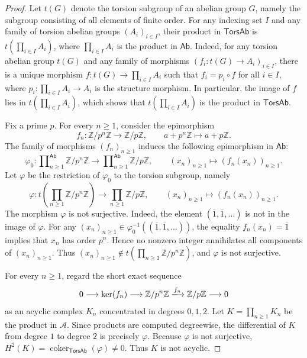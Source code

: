 \documentclass[10pt,a4paper]{amsart}
\theoremstyle{plain}
\theoremstyle{definition}
\theoremstyle{remark}
\begin{document}
\begin{proof}
  Let $t(G)$ denote the torsion subgroup of an abelian group $G$, namely the subgroup consisting of all elements of finite order.
  For any indexing set $I$ and any family of torsion abelian groups $(A_i)_{i\in I}$, their product in $\mathsf{TorsAb}$ is $t\left(\prod_{i\in I}A_i\right)$, where $\prod_{i\in I}A_i$ is the product in $\mathsf{Ab}$.
  Indeed, for any torsion abelian group $t(G)$ and any family of morphisms $(f_i:t(G)\longrightarrow A_i)_{i\in I}$, there is a unique morphism $f:t(G)\longrightarrow\prod_{i\in I}A_i$ such that $f_i=p_i\circ f$ for all $i\in I$, where $p_i:\prod_{i\in I}A_i\longrightarrow A_i$ is the structure morphism.
  In particular, the image of $f$ lies in $t\left(\prod_{i\in I}A_i\right)$, which shows that $t\left(\prod_{i\in I}A_i\right)$ is the product in $\mathsf{TorsAb}$.

  \medskip

  Fix a prime $p$.
  For every $n\geq1$, consider the epimorphism
  \[
    f_n:\mathbb Z/p^n\mathbb Z\longrightarrow\mathbb Z/p\mathbb Z,
    \qquad  a + p^n \mathbb Z \longmapsto a + p \mathbb Z .
  \]
  The family of morphisms $(f_n)_{n\geq1}$ induces the following epimorphism in $\mathsf{Ab}$:
  \[
    \varphi_0 : \prod\nolimits_{n\geq1}^{\mathsf{Ab}}\mathbb Z/p^n\mathbb Z
    \longrightarrow
    \prod\nolimits_{n\geq1}^{\mathsf{Ab}}\mathbb Z/p\mathbb Z,
    \qquad
    (x_n)_{n\geq1}\longmapsto(f_n(x_n))_{n\geq1}.
  \]
  Let $\varphi$ be the restriction of $\varphi_0$ to the torsion subgroup, namely
  \[
    \varphi:
    t\left(\prod_{n\geq1}\mathbb Z/p^n\mathbb Z\right)
    \longrightarrow
    \prod_{n\geq1}\mathbb Z/p\mathbb Z,
    \qquad
    (x_n)_{n\geq1}\longmapsto(f_n(x_n))_{n\geq1}.
  \]
  The morphism $\varphi$ is not surjective.
  Indeed, the element $(\overline1,\overline1,\ldots)$ is not in the image of $\varphi$.
  For any $(x_n)_{n \geq 1} \in \varphi_0 ^{-1}((\overline1,\overline1,\ldots))$, the equality $f_n(x_n)=\overline1$ implies that $x_n$ has order $p^n$.
  Hence no nonzero integer annihilates all components of $(x_n)_{n\geq1}$.
  Thus $(x_n)_{n \geq 1} \notin t\left(\prod_{n\geq1}\mathbb Z/p^n\mathbb Z\right)$, and $\varphi$ is not surjective.

  \medskip

  For every $n\geq1$, regard the short exact sequence
  \[
    0 \longrightarrow \ker(f_n) \longrightarrow \mathbb Z/p^n\mathbb Z \xlongrightarrow{f_n} \mathbb Z/p\mathbb Z \longrightarrow 0
  \]
  as an acyclic complex $K_n$ concentrated in degrees $0,1,2$.
  Let $K=\prod_{n\geq1}K_n$ be the product in $\mathcal A$.
  Since products are computed degreewise, the differential of $K$ from degree $1$ to degree $2$ is precisely $\varphi$.
  Because $\varphi$ is not surjective, $H^2(K)=\operatorname{coker}_{\mathsf{TorsAb}}(\varphi)\neq0$.
  Thus $K$ is not acyclic.


\end{proof}
\end{document}
